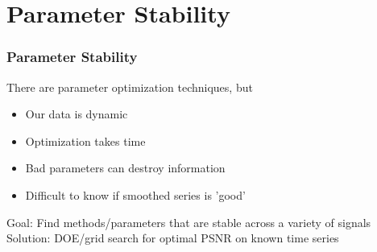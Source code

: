 \documentclass{beamer}
\begin{document}
\section{Parameter Stability}

\begin{frame}
\begin{center}
\frametitle{Parameter Stability}

There are parameter optimization techniques, but

\begin{itemize}

\item Our data is dynamic

\item Optimization takes time

\item Bad parameters can destroy information

\item Difficult to know if smoothed series is 'good'

\end{itemize}

$ $\\

$ $\\

Goal: Find methods/parameters that are stable across a variety of signals\\

$ $\\

Solution: DOE/grid search for optimal PSNR on known time series

\end{center}
\end{frame}

\end{document}
